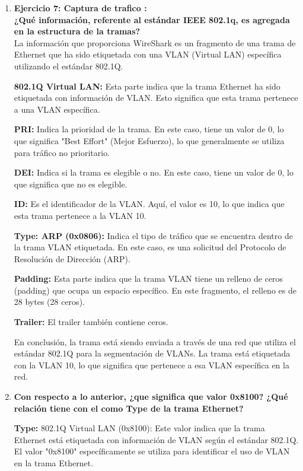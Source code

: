 \documentclass[a4paper]{article}
\begin{document}
\begin{enumerate}
\item \textbf{ Ejercicio 7: Captura de trafico : \\¿Qué información, referente al estándar IEEE 802.1q, es
agregada en la estructura de la tramas?}
\\

	La información que proporciona WireShark es un fragmento de una trama de Ethernet que ha sido etiquetada con una VLAN (Virtual LAN) específica utilizando el estándar 802.1Q. 
	
	\textbf{802.1Q Virtual LAN:} Esta parte indica que la trama Ethernet ha sido etiquetada con información de VLAN. Esto significa que esta trama pertenece a una VLAN específica.
	
	\textbf{PRI:} Indica la prioridad de la trama. En este caso, tiene un valor de 0, lo que significa "Best Effort" (Mejor Esfuerzo), lo que generalmente se utiliza para tráfico no prioritario.
	
	\textbf{DEI:} Indica si la trama es elegible o no. En este caso, tiene un valor de 0, lo que significa que no es elegible.
	
	\textbf{ID:} Es el identificador de la VLAN. Aquí, el valor es 10, lo que indica que esta trama pertenece a la VLAN 10.
	
	\textbf{Type: ARP (0x0806):} Indica el tipo de tráfico que se encuentra dentro de la trama VLAN etiquetada. En este caso, es una solicitud del Protocolo de Resolución de Dirección (ARP).
	
	\textbf{Padding:} Esta parte indica que la trama VLAN tiene un relleno de ceros (padding) que ocupa un espacio específico. En este fragmento, el relleno es de 28 bytes (28 ceros).
	
	\textbf{Trailer:} El trailer también contiene ceros.
	
	En conclusión, la trama está siendo enviada a través de una red que utiliza el estándar 802.1Q para la segmentación de VLANs. La trama está etiquetada con la VLAN 10, lo que significa que pertenece a esa VLAN específica en la red.
	
	\item \textbf{Con respecto a lo anterior, ¿que significa que valor 0x8100? ¿Qué relación tiene con el como Type de la trama Ethernet?}
	
	\textbf{Type:} 802.1Q Virtual LAN (0x8100): Este valor indica que la trama Ethernet está etiquetada con información de VLAN según el estándar 802.1Q. El valor "0x8100" específicamente se utiliza para identificar el uso de VLAN en la trama Ethernet.
	

\end{enumerate}
\end{document}
